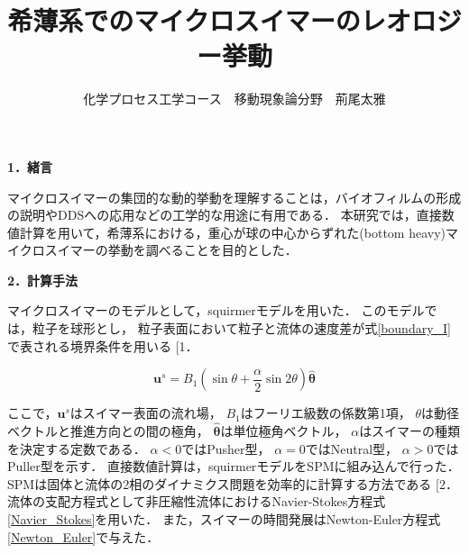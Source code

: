 \documentclass[twocolumns,10pt,a4j]{jarticle}
\title{\Large 希薄系でのマイクロスイマーのレオロジー挙動\vspace{-3truemm}}
\author{\large 化学プロセス工学コース　移動現象論分野　荊尾太雅\vspace{-10zh}}
\date{}
\makeatletter
\DeclareRobustCommand\cite{\unskip
  \@ifnextchar[{\@tempswatrue\@citex}{\@tempswafalse\@citex[]}}
\makeatother
\begin{document}



  \noindent
  \textbf{\large 1．緒言}
  \par
マイクロスイマーの集団的な動的挙動を理解することは，バイオフィルムの形成の説明やDDSへの応用などの工学的な用途に有用である．
本研究では，直接数値計算を用いて，希薄系における，重心が球の中心からずれた(bottom heavy)マイクロスイマーの挙動を調べることを目的とした．


  \noindent
  \textbf{\large 2．計算手法}
  \par
マイクロスイマーのモデルとして，squirmerモデルを用いた．
このモデルでは，粒子を球形とし，
粒子表面において粒子と流体の速度差が式\eqref{boundary_I}で表される境界条件を用いる\cite{1}．

  \vspace{-3truemm}
    \begin{equation}
      \boldsymbol{u}^s = B_1 \left( \sin{\theta} + \frac{\alpha}{2} \sin{2\theta} \right) \hat{\boldsymbol{\theta}}
      \label{boundary_I}
    \end{equation}
  \vspace{-4truemm}

  \noindent
ここで，$\boldsymbol{u}^s$はスイマー表面の流れ場，
$B_1$はフーリエ級数の係数第1項，
$\theta$は動径ベクトルと推進方向との間の極角，
$\hat{\boldsymbol{\theta}}$は単位極角ベクトル，
$\alpha$はスイマーの種類を決定する定数である．
$\alpha<0$ではPusher型，
$\alpha=0$ではNeutral型，
$\alpha>0$ではPuller型を示す．
直接数値計算は，squirmerモデルをSPMに組み込んで行った．
SPMは固体と流体の2相のダイナミクス問題を効率的に計算する方法である\cite{2}．
流体の支配方程式として非圧縮性流体におけるNavier-Stokes方程式\eqref{Navier_Stokes}を用いた．
また，スイマーの時間発展はNewton-Euler方程式\eqref{Newton_Euler}で与えた．
\end{document}
